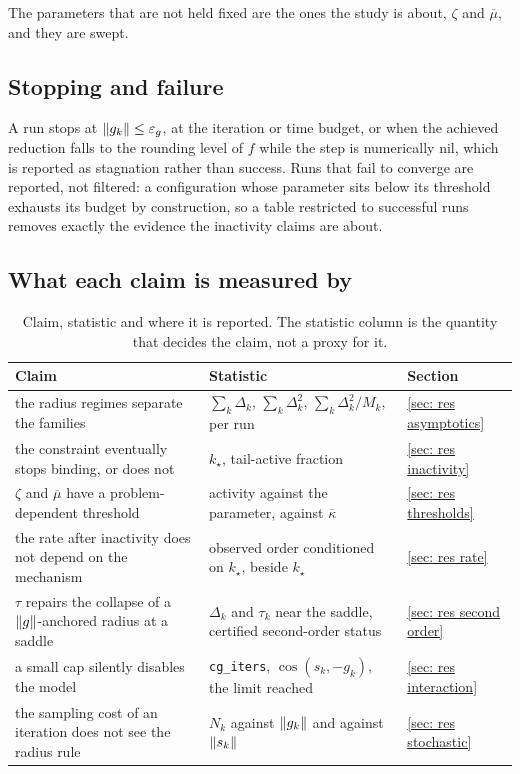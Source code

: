 \documentclass[11pt]{article}
\theoremstyle{plain}
\theoremstyle{definition}
\theoremstyle{remark}
\numberwithin{equation}{section}
\providecommand{\kbar}{\overline{\kappa}}
\providecommand{\kbar}{\overline{\kappa}}
\begin{document}
The parameters that are not held fixed are the ones the study is about, $\zeta$
and $\overline{\mu}$, and they are swept.

\subsection{Stopping and failure}

A run stops at $\left \lVert g_k \right \rVert \leq \varepsilon_g$, at the iteration or time budget,
or when the achieved reduction falls to the rounding level of $f$ while the step
is numerically nil, which is reported as stagnation rather than success. Runs
that fail to converge are reported, not filtered: a configuration whose parameter
sits below its threshold exhausts its budget by construction, so a table
restricted to successful runs removes exactly the evidence the inactivity claims
are about.

\subsection{What each claim is measured by}

\begin{table}[htbp]
  \centering
  \caption{Claim, statistic and where it is reported. The statistic column is the
           quantity that decides the claim, not a proxy for it.}
  \label{tab: claim to statistic}
  \small
  \begin{tabular}{@{}>{\raggedright\arraybackslash}p{54mm}>{\raggedright\arraybackslash}p{58mm}l@{}}
    \toprule
    Claim & Statistic & Section \\
    \midrule
    the radius regimes separate the families
      & $\sum_k\Delta_k$, $\sum_k\Delta_k^2$, $\sum_k\Delta_k^2/M_k$, per run
      & \ref{sec: res asymptotics} \\
    the constraint eventually stops binding, or does not
      & $k_\star$, tail-active fraction
      & \ref{sec: res inactivity} \\
    $\zeta$ and $\overline{\mu}$ have a problem-dependent threshold
      & activity against the parameter, against $\kbar$
      & \ref{sec: res thresholds} \\
    the rate after inactivity does not depend on the mechanism
      & observed order conditioned on $k_\star$, beside $k_\star$
      & \ref{sec: res rate} \\
    $\tau$ repairs the collapse of a $\left \lVert g \right \rVert$-anchored radius at a saddle
      & $\Delta_k$ and $\tau_k$ near the saddle, certified second-order status
      & \ref{sec: res second order} \\
    a small cap silently disables the model
      & \texttt{cg\_iters}, $\cos(s_k,-g_k)$, the limit reached
      & \ref{sec: res interaction} \\
    the sampling cost of an iteration does not see the radius rule
      & $N_k$ against $\left \lVert g_k \right \rVert$ and against $\left \lVert s_k \right \rVert$
      & \ref{sec: res stochastic} \\
    \bottomrule
  \end{tabular}
\end{table}
\end{document}
